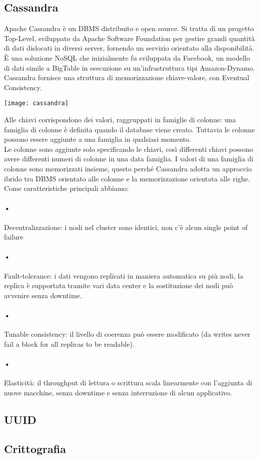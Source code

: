 \subsection{Cassandra}
Apache Cassandra è un DBMS distribuito e open source. Si tratta di un progetto Top-Level, sviluppato da Apache Software Foundation per gestire grandi quantità di dati dislocati in diversi server, fornendo un servizio orientato alla disponibilità.
\\È una soluzione NoSQL che inizialmente fu sviluppata da Facebook, un modello di dati simile a BigTable in esecuzione su un'infrastruttura tipi Amazon-Dynamo. Cassandra fornisce una struttura di memorizzazione chiave-valore, con Eventual Consistency.
\begin{center}
\texttt{[image: cassandra]}
\end{center}
Alle chiavi corrispondono dei valori, raggruppati in famiglie di colonne: una famiglia di colonne è definita quando il database viene creato. Tuttavia le colonne possono essere aggiunte a una famiglia in qualsiasi momento.
\\Le colonne sono aggiunte solo specificando le chiavi, così differenti chiavi possono avere differenti numeri di colonne in una data famiglia. I valori di una famiglia di colonne sono memorizzati insieme, questo perché Cassandra adotta un approccio ibrido tra DBMS orientato alle colonne e la memorizzazione orientata alle righe.
\\Come caratteristiche principali abbiamo:
\paragraph{•} Decentralizzazione: i nodi nel cluster sono identici, non c'è alcun single point of failure
\paragraph{•} Fault-tolerance: i dati vengono replicati in maniera automatica su più nodi, la replica è supportata tramite vari data center e la sostituzione dei nodi può avvenire senza downtime.
\paragraph{•} Tunable consistency: il livello di coerenza può essere modificato (da writes never fail a block for all replicas to be readable).
\paragraph{•} Elasticità: il throughput di lettura o scrittura scala linearmente con l'aggiunta di nuove macchine, senza downtime e senza interruzione di alcun applicativo.

\subsection{UUID}
\subsection{Crittografia}
